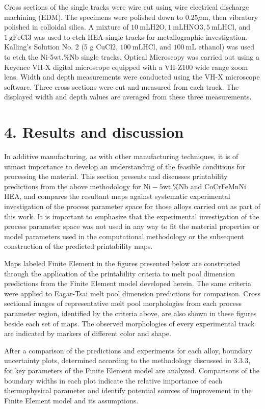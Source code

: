 \documentclass[10pt]{article}
\begin{document}
Cross sections of the single tracks were wire cut using wire electrical discharge machining (EDM). The specimens were polished down to $0.25 \mu \mathrm{m}$, then vibratory polished in colloidal silica. A mixture of $10 \mathrm{~mL} \mathrm{H} 2 \mathrm{O}, 1 \mathrm{~mL} \mathrm{HNO} 3,5 \mathrm{~mL} \mathrm{HCl}$, and $1 \mathrm{~g} \mathrm{FeCl} 3$ was used to etch HEA single tracks for metallographic investigation. Kalling's Solution No. 2 (5 g CuCl2, $100 \mathrm{~mL} \mathrm{HCl}$, and $100 \mathrm{~mL}$ ethanol) was used to etch the Ni-5wt.\%Nb single tracks. Optical Microscopy was carried out using a Keyence VH-X digital microscope equipped with a VH-Z100 wide range zoom lens. Width and depth measurements were conducted using the VH-X microscope software. Three cross sections were cut and measured from each track. The displayed width and depth values are averaged from these three measurements.

\section*{4. Results and discussion}
In additive manufacturing, as with other manufacturing techniques, it is of utmost importance to develop an understanding of the feasible conditions for processing the material. This section presents and discusses printability predictions from the above methodology for $\mathrm{Ni}-5 \mathrm{wt}$.\%Nb and CoCrFeMnNi HEA, and compares the resultant maps against systematic experimental investigation of the process parameter space for those alloys carried out as part of this work. It is important to emphasize that the experimental investigation of the process parameter space was not used in any way to fit the material properties or model parameters used in the computational methodology or the subsequent construction of the predicted printability maps.

Maps labeled Finite Element in the figures presented below are constructed through the application of the printability criteria to melt pool dimension predictions from the Finite Element model developed herein. The same criteria were applied to Eagar-Tsai melt pool dimension predictions for comparison. Cross sectional images of representative melt pool morphologies from each process parameter region, identified by the criteria above, are also shown in these figures beside each set of maps. The observed morphologies of every experimental track are indicated by markers of different color and shape.

After a comparison of the predictions and experiments for each alloy, boundary uncertainty plots, determined according to the methodology discussed in 3.3.3, for key parameters of the Finite Element model are analyzed. Comparisons of the boundary widths in each plot indicate the relative importance of each thermophysical parameter and identify potential sources of improvement in the Finite Element model and its assumptions.
\end{document}
